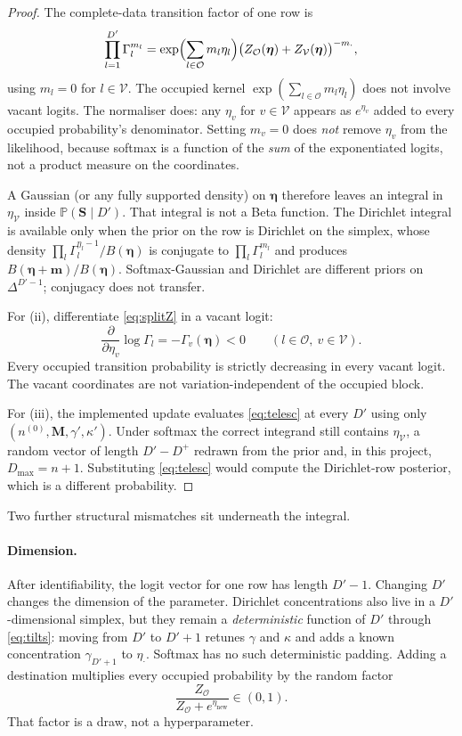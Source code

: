 \documentclass[11pt,a4paper]{article}
\newcommand{\bs}{\boldsymbol}
\newcommand{\Prb}{\mathbb{P}}
\newcommand{\Dplus}{D^{+}}
\newcommand{\etadot}{\eta_{\boldsymbol{\cdot}}}
\newcommand{\simplex}{\Delta}
\theoremstyle{plain}
\theoremstyle{definition}
\theoremstyle{remark}
\begin{document}
\begin{proof}
The complete-data transition factor of one row is
\begin{equation}
\prod_{l=1}^{D'}\Gamma_l^{m_l}
=\exp\Bigl(\sum_{l\in\mathcal O}m_l\eta_l\Bigr)
\bigl(Z_{\mathcal O}(\bs\eta)+Z_{\mathcal V}(\bs\eta)\bigr)^{-m_{\boldsymbol{\cdot}}},
\label{eq:rowlik}
\end{equation}
using $m_l=0$ for $l\in\mathcal V$. The occupied kernel
$\exp(\sum_{l\in\mathcal O}m_l\eta_l)$ does not involve vacant logits. The
normaliser does: any $\eta_v$ for $v\in\mathcal V$ appears as
$e^{\eta_v}$ added to every occupied probability's denominator. Setting
$m_v=0$ does \emph{not} remove $\eta_v$ from the likelihood, because softmax
is a function of the \emph{sum} of the exponentiated logits, not a product
measure on the coordinates.

A Gaussian (or any fully supported density) on $\bs\eta$ therefore leaves
an integral in $\eta_{\mathcal V}$ inside $\Prb(\bs S\mid D')$. That integral
is not a Beta function. The Dirichlet integral is available only when the
prior on the row is Dirichlet on the simplex, whose density
$\prod_l \Gamma_l^{\eta_l-1}/B(\bs\eta)$ is conjugate to
$\prod_l \Gamma_l^{m_l}$ and produces
$B(\bs\eta+\bs m)/B(\bs\eta)$. Softmax-Gaussian and Dirichlet are different
priors on $\simplex^{D'-1}$; conjugacy does not transfer.

For (ii), differentiate \eqref{eq:splitZ} in a vacant logit:
\[
\frac{\partial}{\partial\eta_v}\log\Gamma_l
=-\Gamma_v(\bs\eta)<0
\qquad(l\in\mathcal O,\ v\in\mathcal V).
\]
Every occupied transition probability is strictly decreasing in every vacant
logit. The vacant coordinates are not variation-independent of the occupied
block.

For (iii), the implemented update evaluates \eqref{eq:telesc} at every
$D'$ using only $(n^{(0)},\bs M,\gamma',\kappa')$. Under softmax the
correct integrand still contains $\eta_{\mathcal V}$, a random vector of
length $D'-\Dplus$ redrawn from the prior and, in this project,
$D_{\max}=n+1$. Substituting \eqref{eq:telesc} would compute the
Dirichlet-row posterior, which is a different probability.
\end{proof}

Two further structural mismatches sit underneath the integral.

\paragraph{Dimension.}
After identifiability, the logit vector for one row has length $D'-1$.
Changing $D'$ changes the dimension of the parameter. Dirichlet
concentrations also live in a $D'$-dimensional simplex, but they remain a
\emph{deterministic} function of $D'$ through \eqref{eq:tilts}: moving from
$D'$ to $D'+1$ retunes $\gamma$ and $\kappa$ and adds a known
concentration $\gamma_{D'+1}$ to $\etadot$. Softmax has no such
deterministic padding. Adding a destination multiplies every occupied
probability by the random factor
\begin{equation}
\frac{Z_{\mathcal O}}{Z_{\mathcal O}+e^{\eta_{\mathrm{new}}}}
\in(0,1).
\label{eq:shrink}
\end{equation}
That factor is a draw, not a hyperparameter.
\end{document}
